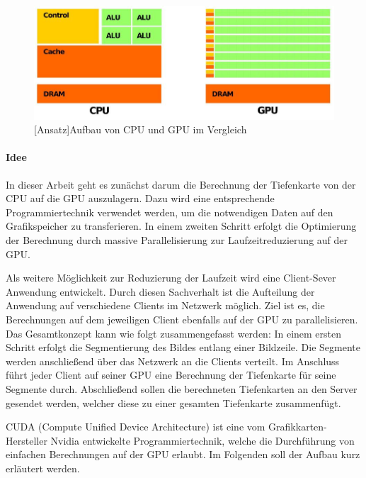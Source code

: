 \documentclass[times, 10pt,twocolumn]{article}
\begin{document}
 \begin{figure}[!ht]
	\centering
	\includegraphics[width=0.9\linewidth]{image/cuda.jpg}
	[Ansatz]{Aufbau von CPU und GPU im Vergleich \cite{CUDA.2015}}
	\label{fig:gpu}
\end{figure}

\paragraph{Idee}
In dieser Arbeit geht es zunächst darum die Berechnung der Tiefenkarte von der CPU auf die GPU auszulagern. Dazu wird eine entsprechende Programmiertechnik verwendet werden, um die notwendigen Daten auf den Grafikspeicher zu transferieren. In einem zweiten Schritt erfolgt die Optimierung der Berechnung durch massive Parallelisierung zur Laufzeitreduzierung auf der GPU. 

Als weitere Möglichkeit zur Reduzierung der Laufzeit wird eine Client-Sever Anwendung entwickelt. Durch diesen Sachverhalt ist die Aufteilung der Anwendung auf verschiedene Clients im Netzwerk möglich. Ziel ist es, die Berechnungen auf dem jeweiligen Client ebenfalls auf der GPU zu parallelisieren. Das Gesamtkonzept kann wie folgt zusammengefasst werden: In einem ersten Schritt erfolgt die Segmentierung des Bildes entlang einer Bildzeile. Die Segmente werden anschließend über das Netzwerk an die Clients verteilt. Im Anschluss führt jeder Client auf seiner GPU eine Berechnung der Tiefenkarte für seine Segmente durch. Abschließend sollen die berechneten Tiefenkarten an den Server gesendet werden, welcher diese zu einer gesamten Tiefenkarte zusammenfügt. 


CUDA (Compute Unified Device Architecture) ist eine vom Grafikkarten-Hersteller Nvidia entwickelte Programmiertechnik, welche die Durchführung von einfachen Berechnungen auf der GPU erlaubt. Im Folgenden soll der Aufbau kurz erläutert werden.
  
\end{document}
